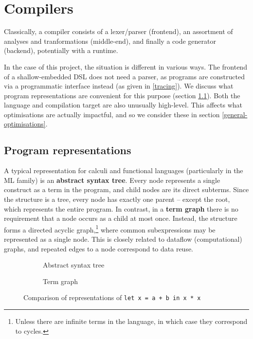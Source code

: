 \section{Compilers}

Classically, a compiler consists of a lexer/parser (frontend), an assortment of analyses and tranformations (middle-end), and finally a code generator (backend), potentially with a runtime. 

In the case of this project, the situation is different in various ways. The frontend of a shallow-embedded DSL does not need a parser, as programs are constructed via a programmatic interface instead (as given in \ref{tracing}). We discuss what program representations are convenient for this purpose (section \ref{representations}). Both the language and compilation target are also unusually high-level. This affects what optimisations are actually impactful, and so we consider these in section \ref{general-optimisations}.

\subsection{Program representations} \label{representations}

A typical representation for calculi and functional languages (particularly in the ML family) is an \textbf{abstract syntax tree}. 
Every node represents a single construct as a term in the program, and child nodes are its direct subterms. 
Since the structure is a tree, every node has exactly one parent -- except the root, which represents the entire program. 
In contrast, in a \textbf{term graph} there is no requirement that a node occurs as a child at most once. 
Instead, the structure forms a directed acyclic graph,\footnote{Unless there are infinite terms in the language, in which case they correspond to cycles.} where common subexpressions may be represented as a single node. This is closely related to dataflow (computational) graphs, and repeated edges to a node correspond to data reuse.

\begin{figure}[ht]
\centering
\begin{subfigure}{.4\textwidth}
  \caption{Abstract syntax tree}
\end{subfigure}%
\begin{subfigure}{.4\textwidth}
  \caption{Term graph}
\end{subfigure}
\caption{Comparison of representations of \texttt{let x = a + b in x * x}}
\label{fig:term-repr}
\end{figure}

